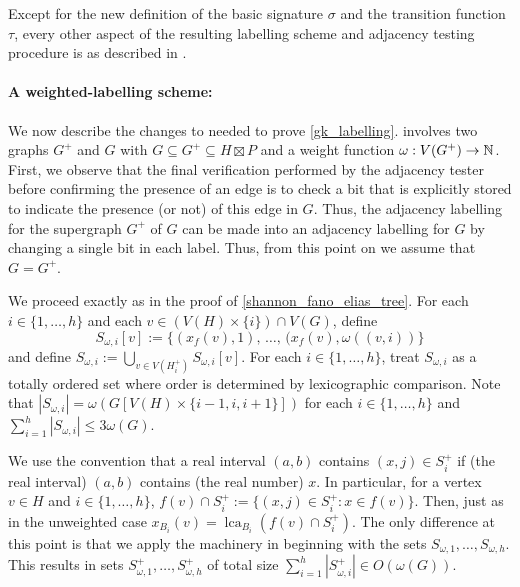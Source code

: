 \documentclass{patmorin}
\renewcommand{\le}{\leqslant}
\DeclareMathOperator{\lca}{lca}
\begin{document}
  Except for the new definition of the basic signature $\sigma$ and the transition function $\tau$, every other aspect of the resulting labelling scheme and adjacency testing procedure is as described in \cite{dujmovic.esperet.ea:adjacency}.

  \paragraph{A weighted-labelling scheme:}
  We now describe the changes to \cite{alstrup.rauhe:improved,dujmovic.esperet.ea:adjacency} needed to prove \cref{gk_labelling}.   involves two graphs $G^+$ and $G$ with $G\subseteq G^+\subseteq H\boxtimes P$ and a weight function $\omega:V(G^+)\to\mathbb{N}$.  First, we observe that the final verification performed by the adjacency tester before confirming the presence of an edge is to check a bit that is explicitly stored to indicate the presence (or not) of this edge in $G$.  Thus, the adjacency labelling for the supergraph $G^+$ of $G$ can be made into an adjacency labelling for $G$ by changing a single bit in each label.  Thus, from this point on we assume that $G=G^+$.

  We proceed exactly as in the proof of \cref{shannon_fano_elias_tree}.
  For each $i\in\{1,\ldots,h\}$ and each $v\in (V(H)\times\{i\})\cap V(G)$, define
  \[
     S_{\omega,i}[v]:=\{(x_f(v),1),\,\ldots,\, (x_f(v),\omega((v,i))\}
  \]
  and define $S_{\omega,i}:=\bigcup_{v\in V(H_i^+)}S_{\omega,i}[v]$.  For each $i\in\{1,\ldots,h\}$, treat $S_{\omega,i}$ as a totally ordered set where order is determined by lexicographic comparison.  Note that $|S_{\omega,i}|=\omega(G[V(H)\times\{i-1,i,i+1\}])$ for each $i\in\{1,\ldots,h\}$ and $\sum_{i=1}^h |S_{\omega,i}|\le 3\omega(G)$.

  We use the convention that a real interval $(a,b)$ contains $(x,j)\in S^+_i$ if (the real interval) $(a,b)$ contains (the real number) $x$. In particular, for a vertex $v\in H$ and $i\in\{1,\ldots,h\}$, $f(v)\cap S^+_i:=\{(x,j)\in S^+_i:x\in f(v)\}$. Then, just as in the unweighted case $x_{B_i}(v)=\lca_{B_i}(f(v)\cap S^+_i)$.  The only difference at this point is that we apply the machinery in \cite{alstrup.rauhe:improved,dujmovic.esperet.ea:adjacency} beginning with the sets $S_{\omega,1},\ldots,S_{\omega,h}$.  This results in sets $S^+_{\omega,1},\ldots,S^+_{\omega,h}$ of total size $\sum_{i=1}^h |S^+_{\omega,i}|\in O(\omega(G))$.
\end{document}
